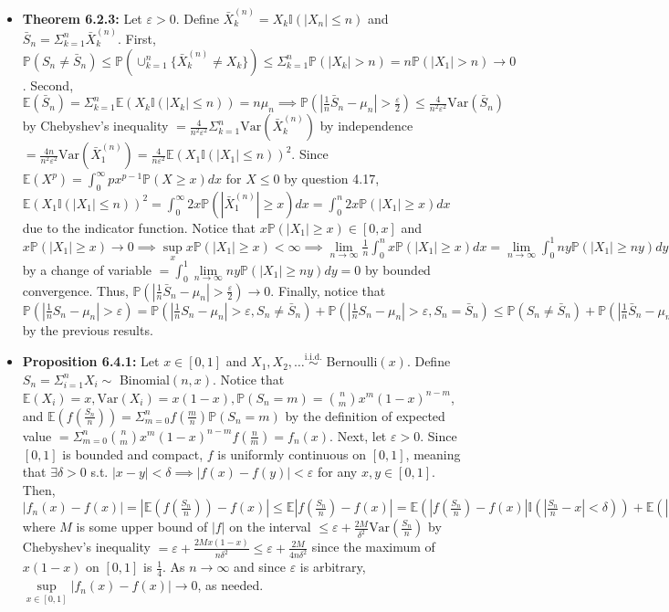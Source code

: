 \documentclass[12pt]{article}
\newcommand{\E}{\mathbb{E}}
\newcommand{\I}{\mathbb{I}}
\newcommand{\p}{\mathbb{P}}
\newcommand{\V}{\text{Var}}
\begin{document}
\begin{itemize}
    \item \textbf{Theorem 6.2.3:} Let $\varepsilon > 0$. Define $\bar X_k^{(n)} = X_k \I(|X_n| \leq n)$ and $\bar S_n = \Sigma_{k=1}^n \bar X_k^{(n)}$. First, $\p(S_n \neq \bar S_n) \leq \p(\cup_{k=1}^n \{\bar X_k^{(n)} \neq X_k\}) \leq \Sigma_{k=1}^n \p(|X_k| > n) = n\p(|X_1| > n) \to 0$. Second, $\E(\bar S_n) = \Sigma_{k=1}^n \E(X_k \I(|X_k| \leq n)) = n\mu_n \implies \p(|\frac{1}{n}\bar S_n - \mu_n| > \frac{\varepsilon}{2}) \leq \frac{4}{n^2 \varepsilon^2}\V(\bar S_n)$ by Chebyshev's inequality $= \frac{4}{n^2 \varepsilon^2}\Sigma_{k=1}^n \V(\bar X_k^{(n)})$ by independence $= \frac{4n}{n^2 \varepsilon^2} \V(\bar X_1^{(n)}) = \frac{4}{n\varepsilon^2} \E(X_1 \I(|X_1| \leq n))^2$. Since $\E(X^p) = \int_0^\infty px^{p-1}\p(X \geq x)dx$ for $X \leq 0$ by question 4.17, $\E(X_1 \I(|X_1| \leq n))^2 = \int_0^\infty 2x\p(|\bar X_1^{(n)}| \geq x)dx = \int_0^n 2x\p(|X_1| \geq x)dx$ due to the indicator function. Notice that $x\p(|X_1| \geq x) \in [0,x]$ and $x\p(|X_1| \geq x) \to 0 \implies \sup \limits_x x\p(|X_1| \geq x) < \infty \implies \lim \limits_{n\to\infty} \frac{1}{n} \int_0^n x\p(|X_1| \geq x)dx = \lim \limits_{n\to\infty} \int_0^1 ny\p(|X_1| \geq ny)dy$ by a change of variable $= \int_0^1 \lim \limits_{n\to\infty} ny\p(|X_1| \geq ny)dy = 0$ by bounded convergence. Thus, $\p(|\frac{1}{n}\bar S_n - \mu_n| > \frac{\varepsilon}{2}) \to 0$. Finally, notice that $\p(|\frac{1}{n}S_n - \mu_n| > \varepsilon) = \p(|\frac{1}{n}S_n - \mu_n| > \varepsilon, S_n \neq \bar S_n) + \p(|\frac{1}{n}S_n - \mu_n| > \varepsilon, S_n = \bar S_n) \leq \p(S_n \neq \bar S_n) + \p(|\frac{1}{n}\bar S_n - \mu_n| > \frac{\varepsilon}{2}) \to 0$ by the previous results.
    \item \textbf{Proposition 6.4.1:} Let $x \in [0,1]$ and $X_1, X_2, \ldots \overset{\text{i.i.d.}}{\sim}$ Bernoulli$(x)$. Define $S_n = \Sigma_{i=1}^n X_i \sim$ Binomial$(n,x)$. Notice that $\E(X_i) = x, \V(X_i) = x(1 - x), \p(S_n = m) = \binom{n}{m} x^m (1 - x)^{n-m}$, and $\E(f(\frac{S_n}{n})) = \Sigma_{m=0}^n f(\frac{m}{n})\p(S_n = m)$ by the definition of expected value $= \Sigma_{m=0}^n \binom{n}{m} x^m (1 - x)^{n-m} f(\frac{n}{m}) = f_n(x)$. Next, let $\varepsilon > 0$. Since $[0,1]$ is bounded and compact, $f$ is uniformly continuous on $[0,1]$, meaning that $\exists \delta > 0$ s.t. $|x - y| < \delta \implies |f(x) - f(y)| < \varepsilon$ for any $x,y \in [0,1]$. Then, $|f_n(x) - f(x)| = |\E(f(\frac{S_n}{n})) - f(x)| \leq \E|f(\frac{S_n}{n}) - f(x)| = \E(|f(\frac{S_n}{n}) - f(x)| \I(|\frac{S_n}{n} - x| < \delta)) + \E(|f(\frac{S_n}{n}) - f(x)| \I(|\frac{S_n}{n} - x| \geq \delta)) \leq \varepsilon + 2M\p(|\frac{S_n}{n} - x| \geq \delta)$ where $M$ is some upper bound of $|f|$ on the interval $\leq \varepsilon + \frac{2M}{\delta^2}\V(\frac{S_n}{n})$ by Chebyshev's inequality $= \varepsilon + \frac{2Mx(1-x)}{n\delta^2} \leq \varepsilon + \frac{2M}{4n\delta^2}$ since the maximum of $x(1 - x)$ on $[0,1]$ is $\frac{1}{4}$. As $n \to \infty$ and since $\varepsilon$ is arbitrary, $\sup \limits_{x\in[0,1]} |f_n(x) - f(x)| \to 0$, as needed.
\end{itemize}
\end{document}
